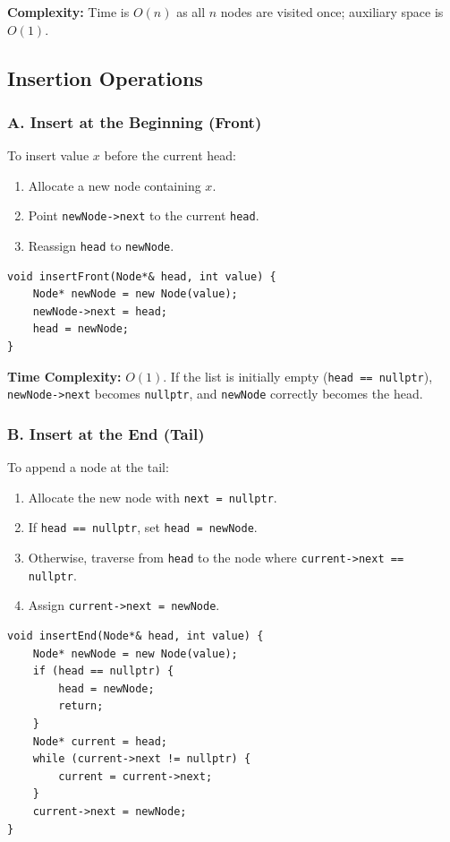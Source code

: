 \textbf{Complexity:} Time is $O(n)$ as all $n$ nodes are visited once; auxiliary space is $O(1)$.

\subsection{Insertion Operations}

\subsubsection{A. Insert at the Beginning (Front)}
To insert value $x$ before the current head:
\begin{enumerate}
    \item Allocate a new node containing $x$.
    \item Point \texttt{newNode->next} to the current \texttt{head}.
    \item Reassign \texttt{head} to \texttt{newNode}.
\end{enumerate}

\begin{lstlisting}[style=cppstyle]
void insertFront(Node*& head, int value) {
    Node* newNode = new Node(value);
    newNode->next = head;
    head = newNode;
}
\end{lstlisting}

\textbf{Time Complexity:} $O(1)$. If the list is initially empty (\texttt{head == nullptr}), \texttt{newNode->next} becomes \texttt{nullptr}, and \texttt{newNode} correctly becomes the head.

\subsubsection{B. Insert at the End (Tail)}
To append a node at the tail:
\begin{enumerate}
    \item Allocate the new node with \texttt{next = nullptr}.
    \item If \texttt{head == nullptr}, set \texttt{head = newNode}.
    \item Otherwise, traverse from \texttt{head} to the node where \texttt{current->next == nullptr}.
    \item Assign \texttt{current->next = newNode}.
\end{enumerate}

\begin{lstlisting}[style=cppstyle]
void insertEnd(Node*& head, int value) {
    Node* newNode = new Node(value);
    if (head == nullptr) {
        head = newNode;
        return;
    }
    Node* current = head;
    while (current->next != nullptr) {
        current = current->next;
    }
    current->next = newNode;
}
\end{lstlisting}

